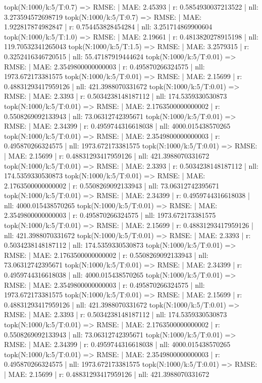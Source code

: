 topk(N:1000/k:5/T:0.7) => RMSE: | MAE: 2.45393 | r: 0.5854930037213522 | nll: 3.273594572698719
topk(N:1000/k:5/T:0.7) => RMSE: | MAE: 1.922817874982847 | r: 0.754453828454284 | nll: 3.251714869900604
topk(N:1000/k:5/T:1.0) => RMSE: | MAE: 2.19661 | r: 0.4813820278915198 | nll: 119.70532341265043
topk(N:1000/k:5/T:1.5) => RMSE: | MAE: 3.2579315 | r: 0.3252416346720515 | nll: 55.47187919444624
topk(N:1000/k:5/T:0.01) => RMSE: | MAE: 2.3549800000000003 | r: 0.495870266324575 | nll: 1973.672173381575
topk(N:1000/k:5/T:0.01) => RMSE: | MAE: 2.15699 | r: 0.48831293417959126 | nll: 421.3988070331672
topk(N:1000/k:5/T:0.01) => RMSE: | MAE: 2.3393 | r: 0.5034238148187112 | nll: 174.5359330530873
topk(N:1000/k:5/T:0.01) => RMSE: | MAE: 2.1763500000000002 | r: 0.5508269092133943 | nll: 73.06312742395671
topk(N:1000/k:5/T:0.01) => RMSE: | MAE: 2.34399 | r: 0.4959744316618038 | nll: 4000.015438570265
topk(N:1000/k:5/T:0.01) => RMSE: | MAE: 2.3549800000000003 | r: 0.495870266324575 | nll: 1973.672173381575
topk(N:1000/k:5/T:0.01) => RMSE: | MAE: 2.15699 | r: 0.48831293417959126 | nll: 421.3988070331672
topk(N:1000/k:5/T:0.01) => RMSE: | MAE: 2.3393 | r: 0.5034238148187112 | nll: 174.5359330530873
topk(N:1000/k:5/T:0.01) => RMSE: | MAE: 2.1763500000000002 | r: 0.5508269092133943 | nll: 73.06312742395671
topk(N:1000/k:5/T:0.01) => RMSE: | MAE: 2.34399 | r: 0.4959744316618038 | nll: 4000.015438570265
topk(N:1000/k:5/T:0.01) => RMSE: | MAE: 2.3549800000000003 | r: 0.495870266324575 | nll: 1973.672173381575
topk(N:1000/k:5/T:0.01) => RMSE: | MAE: 2.15699 | r: 0.48831293417959126 | nll: 421.3988070331672
topk(N:1000/k:5/T:0.01) => RMSE: | MAE: 2.3393 | r: 0.5034238148187112 | nll: 174.5359330530873
topk(N:1000/k:5/T:0.01) => RMSE: | MAE: 2.1763500000000002 | r: 0.5508269092133943 | nll: 73.06312742395671
topk(N:1000/k:5/T:0.01) => RMSE: | MAE: 2.34399 | r: 0.4959744316618038 | nll: 4000.015438570265
topk(N:1000/k:5/T:0.01) => RMSE: | MAE: 2.3549800000000003 | r: 0.495870266324575 | nll: 1973.672173381575
topk(N:1000/k:5/T:0.01) => RMSE: | MAE: 2.15699 | r: 0.48831293417959126 | nll: 421.3988070331672
topk(N:1000/k:5/T:0.01) => RMSE: | MAE: 2.3393 | r: 0.5034238148187112 | nll: 174.5359330530873
topk(N:1000/k:5/T:0.01) => RMSE: | MAE: 2.1763500000000002 | r: 0.5508269092133943 | nll: 73.06312742395671
topk(N:1000/k:5/T:0.01) => RMSE: | MAE: 2.34399 | r: 0.4959744316618038 | nll: 4000.015438570265
topk(N:1000/k:5/T:0.01) => RMSE: | MAE: 2.3549800000000003 | r: 0.495870266324575 | nll: 1973.672173381575
topk(N:1000/k:5/T:0.01) => RMSE: | MAE: 2.15699 | r: 0.48831293417959126 | nll: 421.3988070331672
